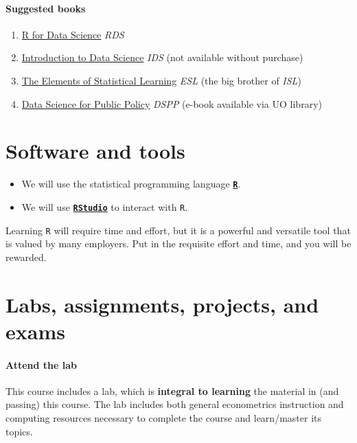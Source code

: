 \documentclass[10pt]{article}
\newcommand{\emf}[1]{\textbf{\textcolor{grass_green}{#1}}}
\begin{document}
\paragraph{Suggested books}

\begin{enumerate}
\item \href{https://r4ds.had.co.nz/}{R for Data Science} \textit{RDS}
\item \href{https://www.springer.com/us/book/9783319500164}{Introduction to Data Science} \textit{IDS} (not available without purchase)
\item \href{http://web.stanford.edu/~hastie/ElemStatLearn/}{The Elements of Statistical Learning} \textit{ESL} (the big brother of \textit{ISL})
\item \href{https://link.springer.com/book/10.1007/978-3-030-71352-2}{Data Science for Public Policy} \textit{DSPP} (e-book available via UO library)

\end{enumerate}

\section*{Software and tools}

\begin{itemize}
  \item We will use the statistical programming language \href{https://www.r-project.org/}{\textbf{\texttt{R}}}.
  \item We will use \href{https://www.rstudio.com}{\textbf{\texttt{RStudio}}} to interact with \texttt{R}.
\end{itemize}
Learning \texttt{R} will require time and effort, but it is a powerful and versatile tool that is valued by many employers. Put in the requisite effort and time, and you will be rewarded.

\section*{Labs, assignments, projects, and exams}

\paragraph{Attend the lab} This course includes a lab, which is \emf{integral to learning} the material in (and passing) this course. The lab includes both general econometrics instruction and computing resources necessary to complete the course and learn/master its topics.
\end{document}
